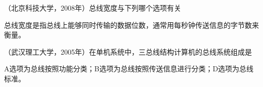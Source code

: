 \question （北京科技大学，2008年）总线宽度与下列哪个选项有关
\par{}
\begin{solution}总线宽度是指总线上能够同时传输的数据位数，通常用每秒钟传送信息的字节数来衡量。
\end{solution}
\question （武汉理工大学，2005年）在单机系统中，三总线结构计算机的总线系统组成是
\par{}
\begin{solution}A选项为总线按照功能分类；B选项为总线按照传送信息进行分类；D选项为总线标准。
\end{solution}
